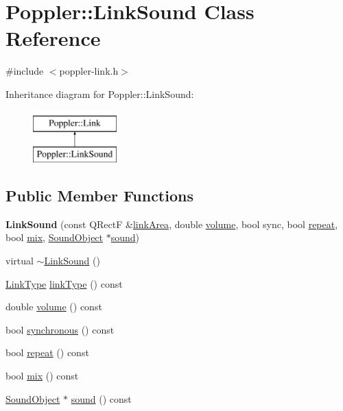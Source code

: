 \hypertarget{class_poppler_1_1_link_sound}{}\section{Poppler\+:\+:Link\+Sound Class Reference}
\label{class_poppler_1_1_link_sound}


{\ttfamily \#include $<$poppler-\/link.\+h$>$}

Inheritance diagram for Poppler\+:\+:Link\+Sound\+:\begin{figure}[H]
\begin{center}
\leavevmode
\includegraphics[height=2.000000cm]{class_poppler_1_1_link_sound}
\end{center}
\end{figure}
\subsection*{Public Member Functions}
\begin{DoxyCompactItemize}
\item 
\mbox{\label{class_poppler_1_1_link_sound_ae47e5e47687e3cf5e44efdb859d63d10}} 
{\bfseries Link\+Sound} (const Q\+RectF \&\hyperlink{class_poppler_1_1_link_adb525b65cfac39dcdba3f59faa57a0bf}{link\+Area}, double \hyperlink{class_poppler_1_1_link_sound_ae29321c335e60b265077f37e1839d946}{volume}, bool sync, bool \hyperlink{class_poppler_1_1_link_sound_a1169c94ef7d988a1fbe4bd84b0a2a9d2}{repeat}, bool \hyperlink{class_poppler_1_1_link_sound_a3220c1ae670fe98c97de88224aa30447}{mix}, \hyperlink{class_poppler_1_1_sound_object}{Sound\+Object} $\ast$\hyperlink{class_poppler_1_1_link_sound_af44a1f6748f459b776214e910a924cc3}{sound})
\item 
virtual \hyperlink{class_poppler_1_1_link_sound_aefbec07b84feb2618aab5446e8af7a2f}{$\sim$\+Link\+Sound} ()
\item 
\hyperlink{class_poppler_1_1_link_af0dacfa77a548bb043dbae4bb9dc6c1e}{Link\+Type} \hyperlink{class_poppler_1_1_link_sound_a832bdadf229fb2379143d001e15a4697}{link\+Type} () const
\item 
double \hyperlink{class_poppler_1_1_link_sound_ae29321c335e60b265077f37e1839d946}{volume} () const
\item 
bool \hyperlink{class_poppler_1_1_link_sound_a8e6bd04ee0f7e6aa429d692d9532dd20}{synchronous} () const
\item 
bool \hyperlink{class_poppler_1_1_link_sound_a1169c94ef7d988a1fbe4bd84b0a2a9d2}{repeat} () const
\item 
bool \hyperlink{class_poppler_1_1_link_sound_a3220c1ae670fe98c97de88224aa30447}{mix} () const
\item 
\hyperlink{class_poppler_1_1_sound_object}{Sound\+Object} $\ast$ \hyperlink{class_poppler_1_1_link_sound_af44a1f6748f459b776214e910a924cc3}{sound} () const
\end{DoxyCompactItemize}
